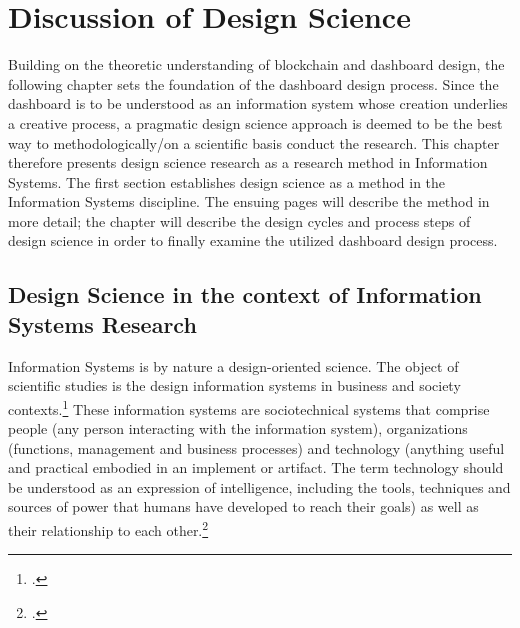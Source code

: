 \chapter{Discussion of Design Science}

Building on the theoretic understanding of blockchain and dashboard design, the following chapter sets the foundation of the dashboard design process. Since the dashboard is to be understood as an information system whose creation underlies a creative process, a pragmatic design science approach is deemed to be the best way to methodologically/on a scientific basis conduct the research. This chapter therefore presents design science research as a research method in Information Systems. The first section establishes design science as a method in the Information Systems discipline. The ensuing pages will describe the method in more detail; the chapter will describe the design cycles and process steps of design science in order to finally examine the utilized dashboard design process.

\section{Design Science in the context of Information Systems Research}

Information Systems is by nature a design-oriented science. The object of scientific studies is the design information systems in business and society contexts.\footcite[Cf.][p.671]{OsterleMemorandumzurgestaltungsorientierten2010} These information systems are sociotechnical systems that comprise people (any person interacting with the information system), organizations (functions, management and business processes) and technology (anything useful and practical embodied in an implement or artifact. The term technology should be understood as an expression of intelligence, including the tools, techniques and sources of power that humans have developed to reach their goals) as well as their relationship to each other.\footcites[Cf.][p.98]{HevnerDesignScienceResearch2004}[cf.][p.11]{OsterleGestaltungsorientierteWirtschaftsinformatikPladoyer2010}[cf.][p.252]{MarchDesignnaturalscience1995}

